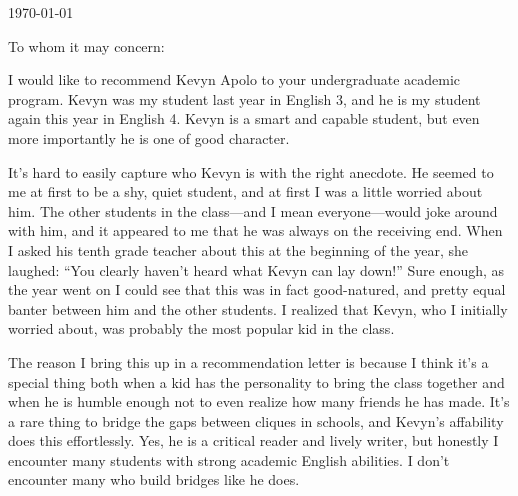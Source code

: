 \documentclass[11pt, letterpaper]{letter} %
\begin{document}

\begin{letter}{
	\today\\	
}


\opening{To whom it may concern:}

I would like to recommend Kevyn Apolo to your undergraduate academic program. Kevyn was my student last year in English 3, and he is my student again this year in English 4. Kevyn is a smart and capable student, but even more importantly he is one of good character.

It's hard to easily capture who Kevyn is with the right anecdote. He seemed to me at first to be a shy, quiet student, and at first I was a little worried about him. The other students in the class---and I mean everyone---would joke around with him, and it appeared to me that he was always on the receiving end. When I asked his tenth grade teacher about this at the beginning of the year, she laughed: ``You clearly haven't heard what Kevyn can lay down!'' Sure enough, as the year went on I could see that this was in fact good-natured, and pretty equal banter between him and the other students. I realized that Kevyn, who I initially worried about, was probably the most popular kid in the class.

The reason I bring this up in a recommendation letter is because I think it's a special thing both when a kid has the personality to bring the class together and when he is humble enough not to even realize how many friends he has made. It's a rare thing to bridge the gaps between cliques in schools, and Kevyn's affability does this effortlessly. Yes, he is a critical reader and lively writer, but honestly I encounter many students with strong academic English abilities. I don't encounter many who build bridges like he does.


\end{letter}
\end{document}

